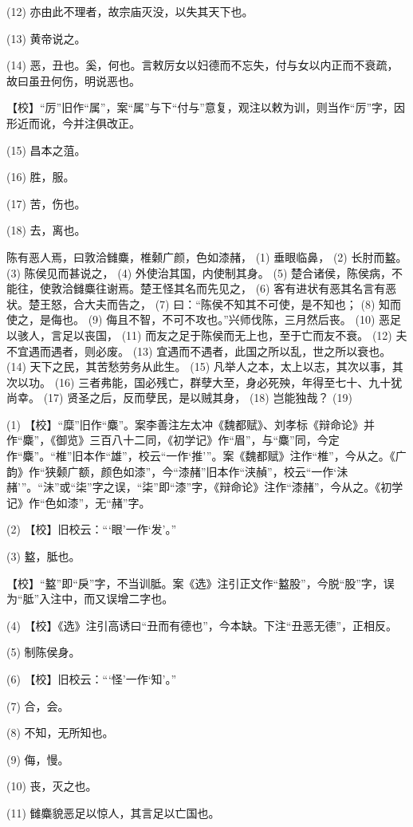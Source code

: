 \documentclass[12pt,UTF8]{ctexbook}
\begin{document}
(12) 亦由此不理者，故宗庙灭没，以失其天下也。

(13) 黄帝说之。

(14) 恶，丑也。奚，何也。言敕厉女以妇德而不忘失，付与女以内正而不衰疏，故曰虽丑何伤，明说恶也。

【校】“厉”旧作“属”，案“属”与下“付与”意复，观注以敕为训，则当作“厉”字，因形近而讹，今并注俱改正。

(15) 昌本之菹。

(16) 胜，服。

(17) 苦，伤也。

(18) 去，离也。

陈有恶人焉，曰敦洽雠麋，椎颡广颜，色如漆赭， (1) 垂眼临鼻， (2) 长肘而盭。 (3) 陈侯见而甚说之， (4) 外使治其国，内使制其身。 (5) 楚合诸侯，陈侯病，不能往，使敦洽雠麋往谢焉。楚王怪其名而先见之， (6) 客有进状有恶其名言有恶状。楚王怒，合大夫而告之， (7) 曰：“陈侯不知其不可使，是不知也； (8) 知而使之，是侮也。 (9) 侮且不智，不可不攻也。”兴师伐陈，三月然后丧。 (10) 恶足以骇人，言足以丧国， (11) 而友之足于陈侯而无上也，至于亡而友不衰。 (12) 夫不宜遇而遇者，则必废。 (13) 宜遇而不遇者，此国之所以乱，世之所以衰也。 (14) 天下之民，其苦愁劳务从此生。 (15) 凡举人之本，太上以志，其次以事，其次以功。 (16) 三者弗能，国必残亡，群孽大至，身必死殃，年得至七十、九十犹尚幸。 (17) 贤圣之后，反而孽民，是以贼其身， (18) 岂能独哉？ (19)

(1) 【校】“糜”旧作“麋”。案李善注左太冲《魏都赋》、刘孝标《辩命论》并作“麋”，《御览》三百八十二同，《初学记》作“眉”，与“麋”同，今定作“麋”。“椎”旧本作“雄”，校云“一作‘推’”。案《魏都赋》注作“椎”，今从之。《广韵》作“狭颡广额，颜色如漆”，今“漆赭”旧本作“浃赬”，校云“一作‘沬赭’”。“沬”或“柒”字之误，“柒”即“漆”字，《辩命论》注作“漆赭”，今从之。《初学记》作“色如漆”，无“赭”字。

(2) 【校】旧校云：“‘眼’一作‘发’。”

(3) 盭，胝也。

【校】“盭”即“戾”字，不当训胝。案《选》注引正文作“盭股”，今脱“股”字，误为“胝”入注中，而又误增二字也。

(4) 【校】《选》注引高诱曰“丑而有德也”，今本缺。下注“丑恶无德”，正相反。

(5) 制陈侯身。

(6) 【校】旧校云：“‘怪’一作‘知’。”

(7) 合，会。

(8) 不知，无所知也。

(9) 侮，慢。

(10) 丧，灭之也。

(11) 雠麋貌恶足以惊人，其言足以亡国也。
\end{document}
